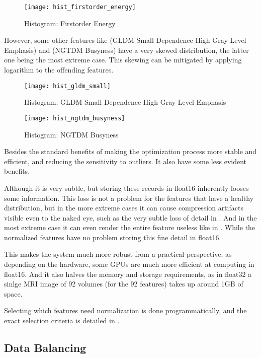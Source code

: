 \begin{figure}[H]
\centering
\texttt{[image: hist\_firstorder\_energy]}
\caption{Histogram: Firstorder Energy}
\label{fig:hist_fie}
\end{figure}

However, some other features like  (GLDM Small Dependence High Gray Level Emphasis) and  (NGTDM Busyness) have a very skewed distribution, the latter one being the most extreme case. This skewing can be mitigated by applying logarithm to the offending features.

\begin{figure}[H]
\centering
\texttt{[image: hist\_gldm\_small]}
\caption{Histogram: GLDM Small Dependence High Gray Level Emphasis}
\label{fig:hist_gls}
\end{figure}

\begin{figure}[H]
\centering
\texttt{[image: hist\_ngtdm\_busyness]}
\caption{Histogram: NGTDM Busyness}
\label{fig:hist_ngb}
\end{figure}

Besides the standard benefits of making the optimization process more stable and efficient, and reducing the sensitivity to outliers. It also have some less evident benefits.\par
Although it is very subtle, but storing these records in float16 inherently looses some information. This loss is not a problem for the features that have a healthy distribution, but in the more extreme cases it can cause compression artifacts visible even to the naked eye, such as the very subtle loss of detail in . And in the most extreme case it can even render the entire feature useless like in . While the normalized features have no problem storing this fine detail in float16.\par
This makes the system much more robust from a practical perspective; as depending on the hardware, some GPUs are much more efficient at computing in float16. And it also halves the memory and storage requirements, as in float32 a sinlge MRI image of 92 volumes (for the 92 features) takes up around 1GB of space.\par
Selecting which features need normalization is done programmatically, and the exact selection criteria is detailed in .

\subsection{Data Balancing}

